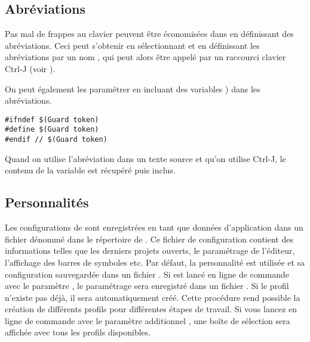 

\subsection{Abréviations}\label{sec:Abbreviations}

Pas mal de frappes au clavier peuvent être économisées dans \codeblocks en définissant des abréviations. Ceci peut s'obtenir en sélectionnant  et en définissant les abréviations par un nom , qui peut alors être appelé par un raccourci clavier Ctrl-J (voir ).


On peut également les paramétrer en incluant des variables ) dans les abréviations.

\begin{lstlisting}
#ifndef $(Guard token)
#define $(Guard token)
#endif // $(Guard token)
\end{lstlisting}

Quand on utilise l'abréviation  dans un texte source et qu'on utilise Ctrl-J, le contenu de la variable est récupéré puis inclus.

\subsection{Personnalités}\label{sec:personalities}

Les configurations de \codeblocks sont enregistrées en tant que données d'application dans un fichier dénommé  dans le répertoire de . Ce fichier de configuration contient des informations telles que les derniers projets ouverts, le paramétrage de l'éditeur, l'affichage des barres de symboles etc. Par défaut, la personnalité  est utilisée et sa configuration sauvegardée dans un fichier . Si \codeblocks est lancé en ligne de commande avec le paramètre , le paramétrage sera enregistré dans un fichier . Si le profil n'existe pas déjà, il sera automatiquement créé. Cette procédure rend possible la création de différents profils pour différentes étapes de travail. Si vous lancez \codeblocks en ligne de commande avec le paramètre additionnel , une boîte de sélection sera affichée avec tous les profils disponibles.

